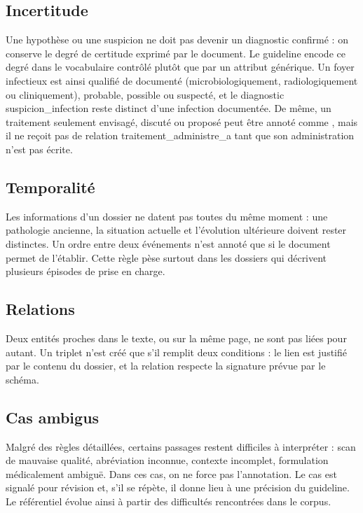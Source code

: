 \subsection{Incertitude}\label{sec:c3-3-6-5}

Une hypothèse ou une suspicion ne doit pas devenir un diagnostic confirmé : on conserve le degré de certitude exprimé par le document. Le guideline encode ce degré dans le vocabulaire contrôlé plutôt que par un attribut générique. Un foyer infectieux est ainsi qualifié de documenté (microbiologiquement, radiologiquement ou cliniquement), probable, possible ou suspecté, et le diagnostic suspicion\_infection reste distinct d’une infection documentée. De même, un traitement seulement envisagé, discuté ou proposé peut être annoté comme , mais il ne reçoit pas de relation traitement\_administre\_a tant que son administration n’est pas écrite.

\subsection{Temporalité}\label{sec:c3-3-6-6}

Les informations d’un dossier ne datent pas toutes du même moment : une pathologie ancienne, la situation actuelle et l’évolution ultérieure doivent rester distinctes. Un ordre entre deux événements n’est annoté que si le document permet de l’établir. Cette règle pèse surtout dans les dossiers qui décrivent plusieurs épisodes de prise en charge.

\subsection{Relations}\label{sec:c3-3-6-7}

Deux entités proches dans le texte, ou sur la même page, ne sont pas liées pour autant. Un triplet n’est créé que s’il remplit deux conditions : le lien est justifié par le contenu du dossier, et la relation respecte la signature prévue par le schéma.

\subsection{Cas ambigus}\label{sec:c3-3-6-8}

Malgré des règles détaillées, certains passages restent difficiles à interpréter : scan de mauvaise qualité, abréviation inconnue, contexte incomplet, formulation médicalement ambiguë. Dans ces cas, on ne force pas l’annotation. Le cas est signalé pour révision et, s’il se répète, il donne lieu à une précision du guideline. Le référentiel évolue ainsi à partir des difficultés rencontrées dans le corpus.


